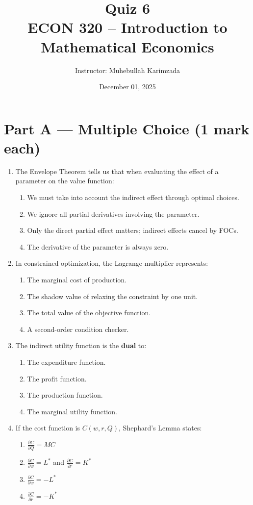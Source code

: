 \documentclass[12pt]{article}
\title{Quiz 6\\ \vspace{5pt}
\large ECON 320 -- Introduction to Mathematical Economics}
\author{Instructor: Muhebullah Karimzada}
\date{December 01, 2025}
\begin{document}
\maketitle

\section*{Part A — Multiple Choice (1 mark each)}

\begin{enumerate}

\item The Envelope Theorem tells us that when evaluating the effect of a parameter on the value function:
\begin{enumerate}
\item We must take into account the indirect effect through optimal choices.
\item We ignore all partial derivatives involving the parameter.
\item Only the direct partial effect matters; indirect effects cancel by FOCs.
\item The derivative of the parameter is always zero.
\end{enumerate}

\item In constrained optimization, the Lagrange multiplier represents:
\begin{enumerate}
\item The marginal cost of production.
\item The shadow value of relaxing the constraint by one unit.
\item The total value of the objective function.
\item A second-order condition checker.
\end{enumerate}

\item The indirect utility function is the \textbf{dual} to:
\begin{enumerate}
\item The expenditure function.
\item The profit function.
\item The production function.
\item The marginal utility function.
\end{enumerate}
\newpage
\item If the cost function is $C(w,r,Q)$, Shephard's Lemma states:
\begin{enumerate}
\item $\displaystyle \frac{\partial C}{\partial Q} = MC$
\item $\displaystyle \frac{\partial C}{\partial w} = L^*$ and $\frac{\partial C}{\partial r} = K^*$
\item $\displaystyle \frac{\partial C}{\partial w} = -L^*$
\item $\displaystyle \frac{\partial C}{\partial r} = -K^*$
\end{enumerate}


\end{enumerate}
\end{document}
